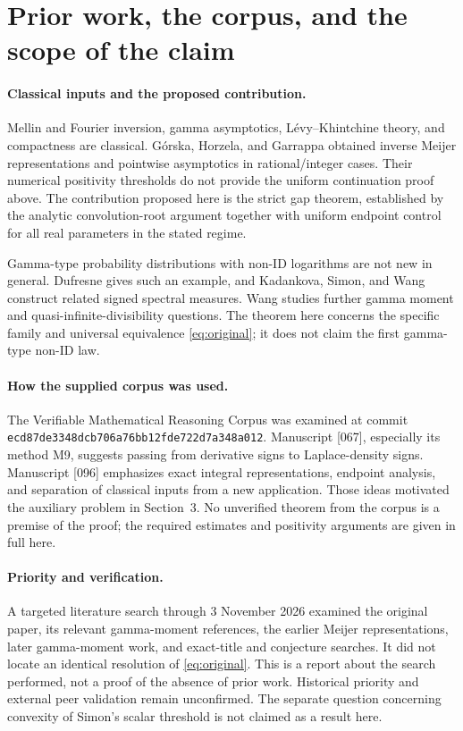 \documentclass[11pt,a4paper]{article}
\numberwithin{equation}{section}
\theoremstyle{definition}\newtheorem{definition}[theorem]{Definition}
\theoremstyle{remark}\newtheorem{remark}[theorem]{Remark}
\begin{document}
\section{Prior work, the corpus, and the scope of the claim}

\paragraph{Classical inputs and the proposed contribution.}
Mellin and Fourier inversion, gamma asymptotics, L\'evy--Khintchine
theory, and compactness are classical. G\'orska, Horzela, and Garrappa
\cite{GHG} obtained inverse Meijer representations and pointwise
asymptotics in rational/integer cases. Their numerical positivity
thresholds do not provide the uniform continuation proof above.
The contribution proposed here is the strict gap theorem, established
by the analytic convolution-root argument together with uniform
endpoint control for all real parameters in the stated regime.

Gamma-type probability distributions with non-ID logarithms are not
new in general. Dufresne \cite[Example 2]{Dufresne} gives such an
example, and Kadankova, Simon, and Wang \cite{KSW} construct related
signed spectral measures. Wang \cite{Wang} studies further gamma
moment and quasi-infinite-divisibility questions. The theorem here
concerns the specific family and universal equivalence
\eqref{eq:original}; it does not claim the first gamma-type non-ID law.

\paragraph{How the supplied corpus was used.}
The Verifiable Mathematical Reasoning Corpus \cite{Corpus} was
examined at commit
\texttt{ecd87de3348dcb706a76bb12fde722d7a348a012}.
Manuscript [067], especially its method M9, suggests passing from
derivative signs to Laplace-density signs. Manuscript [096] emphasizes
exact integral representations, endpoint analysis, and separation of
classical inputs from a new application. Those ideas motivated the
auxiliary problem in Section~3. No unverified theorem from the corpus
is a premise of the proof; the required estimates and positivity
arguments are given in full here.

\paragraph{Priority and verification.}
A targeted literature search through 3 November 2026 examined the
original paper, its relevant gamma-moment references, the earlier
Meijer representations, later gamma-moment work, and exact-title and
conjecture searches. It did not locate an identical resolution of
\eqref{eq:original}. This is a report about the search performed, not
a proof of the absence of prior work. Historical priority and external
peer validation remain unconfirmed. The separate question concerning
convexity of Simon's scalar threshold is not claimed as a result here.
\end{document}
